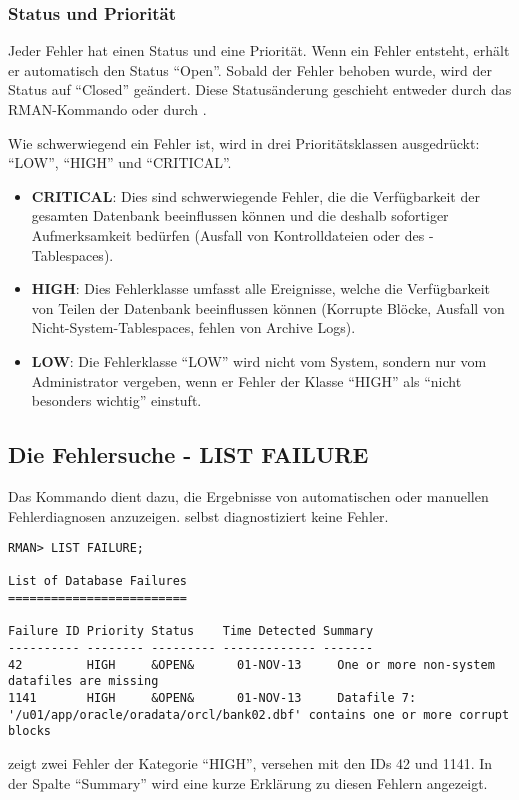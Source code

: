         \subsubsection{Status und Priorität}
          Jeder Fehler hat einen Status und eine Priorität. Wenn ein Fehler entsteht, erhält er automatisch den Status \enquote{Open}. Sobald der Fehler behoben wurde, wird der Status auf \enquote{Closed} geändert. Diese Statusänderung geschieht entweder durch das RMAN-Kommando  oder durch .

          Wie schwerwiegend ein Fehler ist, wird in drei Prioritätsklassen ausgedrückt: \enquote{LOW}, \enquote{HIGH} und \enquote{CRITICAL}.
          \begin{itemize}
            \item \textbf{CRITICAL}: Dies sind schwerwiegende Fehler, die die Verfügbarkeit der gesamten Datenbank beeinflussen können und die deshalb sofortiger Aufmerksamkeit bedürfen (Ausfall von Kontrolldateien oder des -Tablespaces).
            \item \textbf{HIGH}: Dies Fehlerklasse umfasst alle Ereignisse, welche die Verfügbarkeit von Teilen der Datenbank beeinflussen können (Korrupte Blöcke, Ausfall von Nicht-System-Tablespaces, fehlen von Archive Logs).
            \item \textbf{LOW}: Die Fehlerklasse \enquote{LOW} wird nicht vom System, sondern nur vom Administrator vergeben, wenn er Fehler der Klasse \enquote{HIGH} als \enquote{nicht besonders wichtig} einstuft.
          \end{itemize}
      \subsection{Die Fehlersuche - LIST FAILURE}
        Das Kommando  dient dazu, die Ergebnisse von automatischen oder manuellen Fehlerdiagnosen anzuzeigen.  selbst diagnostiziert keine Fehler.
        \begin{lstlisting}[caption={Das Kommando \languagerman{LIST FAILURE}},label=admin1538,language=rman]
RMAN> LIST FAILURE;

List of Database Failures
=========================

Failure ID Priority Status    Time Detected Summary
---------- -------- --------- ------------- -------
42         HIGH     &OPEN&      01-NOV-13     One or more non-system
datafiles are missing
1141       HIGH     &OPEN&      01-NOV-13     Datafile 7:
'/u01/app/oracle/oradata/orcl/bank02.dbf' contains one or more corrupt blocks
        \end{lstlisting}
         zeigt zwei Fehler der Kategorie \enquote{HIGH}, versehen mit den IDs 42 und 1141. In der Spalte \enquote{Summary} wird eine kurze Erklärung zu diesen Fehlern angezeigt.
